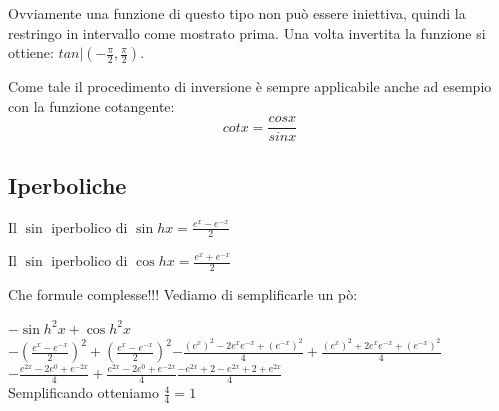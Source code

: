 Ovviamente una funzione di questo tipo non può essere iniettiva, quindi la restringo in intervallo come mostrato prima.
Una volta invertita la funzione si ottiene: $tan|(-\frac{\pi}{2},\frac{\pi}{2})$.


Come tale il procedimento di inversione è sempre applicabile anche ad esempio con la funzione cotangente:
\begin{equation}
    cotx=\frac{cosx}{sinx}
\end{equation}

\subsection*{Iperboliche}
\begin{definition}
    Il $\sin$ iperbolico di $\sin hx=\frac{e^x-e^{-x}}{2}$
    
    Il $\sin$ iperbolico di $\cos hx=\frac{e^x+e^{-x}}{2}$
\end{definition}

Che formule complesse!!! Vediamo di semplificarle un pò:
\begin{osservation}
    $-\sin h^2x+\cos h^2x$\\
    $-(\frac{e^x-e^{-x}}{2})^2+(\frac{e^x-e^{-x}}{2})^2$\hspace{1cm}$-\frac{(e^x)^2-2e^xe^{-x}+(e^{-x})^2}{4}+\frac{(e^x)^2+2e^xe^{-x}+(e^{-x})^2}{4}$\\
    $-\frac{e^{2x}-2e^0+e^{-2x}}{4}+\frac{e^{2x}-2e^0+e^{-2x}}{4}$\hspace{1cm}$\frac{-e^{2x}+2-e^{2x}+2+e^{2x}}{4}$\\
    Semplificando otteniamo $\frac{4}{4}=1$
\end{osservation}
